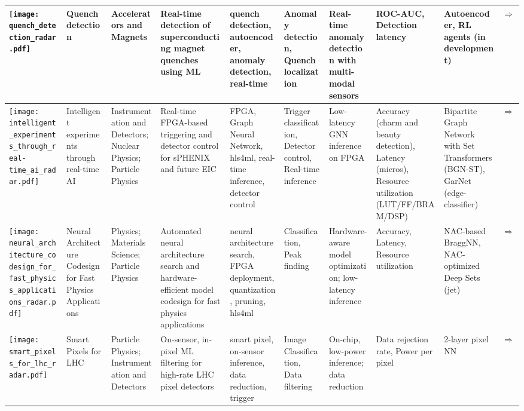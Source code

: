 \begin{landscape}
{\begin{longtable}{|p{}|p{}|p{}|p{}|p{}|p{}|p{}|p{}|p{}|p{}|}
\texttt{[image: quench\_detection\_radar.pdf]} & Quench detection & Accelerators and Magnets & Real-time detection of superconducting magnet quenches using ML & quench detection, autoencoder, anomaly detection, real-time & Anomaly detection, Quench localization & Real-time anomaly detection with multi-modal sensors & ROC-AUC, Detection latency & Autoencoder, RL agents (in development) & \cite{quench2024}\href{https://indico.cern.ch/event/1387540/contributions/6153618/attachments/2948441/5182077/fast\_ml\_magnets\_2024\_final.pdf}{$\Rightarrow$} \\ \hline
\texttt{[image: intelligent\_experiments\_through\_real-time\_ai\_radar.pdf]} & Intelligent experiments through real-time AI & Instrumentation and Detectors; Nuclear Physics; Particle Physics & Real-time FPGA-based triggering and detector control for sPHENIX and future EIC & FPGA, Graph Neural Network, hls4ml, real-time inference, detector control & Trigger classification, Detector control, Real-time inference & Low-latency GNN inference on FPGA & Accuracy (charm and beauty detection), Latency (micros), Resource utilization (LUT/FF/BRAM/DSP) & Bipartite Graph Network with Set Transformers (BGN-ST), GarNet (edge-classifier) & \cite{kvapil2025intelligentexperimentsrealtimeai}\href{https://arxiv.org/pdf/2501.04845}{$\Rightarrow$} \\ \hline
\texttt{[image: neural\_architecture\_codesign\_for\_fast\_physics\_applications\_radar.pdf]} & Neural Architecture Codesign for Fast Physics Applications & Physics; Materials Science; Particle Physics & Automated neural architecture search and hardware-efficient model codesign for fast physics applications & neural architecture search, FPGA deployment, quantization, pruning, hls4ml & Classification, Peak finding & Hardware-aware model optimization; low-latency inference & Accuracy, Latency, Resource utilization & NAC-based BraggNN, NAC-optimized Deep Sets (jet) & \cite{weitz2025neuralarchitecturecodesignfast}\href{https://arxiv.org/abs/2501.05515}{$\Rightarrow$} \\ \hline
\texttt{[image: smart\_pixels\_for\_lhc\_radar.pdf]} & Smart Pixels for LHC & Particle Physics; Instrumentation and Detectors & On-sensor, in-pixel ML filtering for high-rate LHC pixel detectors & smart pixel, on-sensor inference, data reduction, trigger & Image Classification, Data filtering & On-chip, low-power inference; data reduction & Data rejection rate, Power per pixel & 2-layer pixel NN & \cite{parpillon2024smartpixelsinpixelai}\href{https://arxiv.org/abs/2406.14860}{$\Rightarrow$} \\ \hline

\end{longtable}}
\end{landscape}
